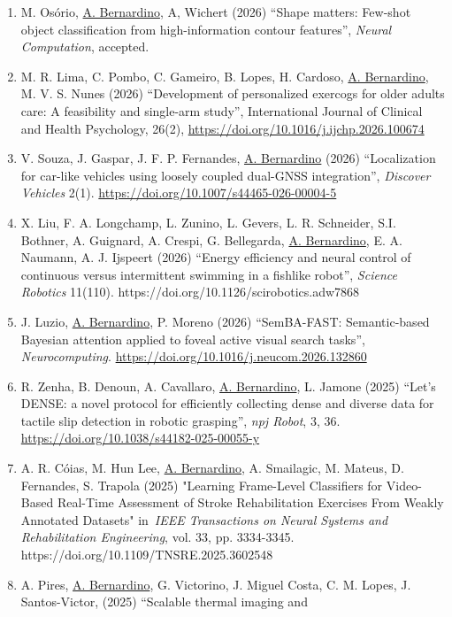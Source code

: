 \begin{enumerate}
\def\labelenumi{\arabic{enumi}.}
\item
  M. Osório, \ul{A. Bernardino}, A, Wichert (2026) ``Shape matters:
  Few-shot object classification from high-information contour
  features'', \emph{Neural Computation}, accepted.
\item
  M. R. Lima, C. Pombo, C. Gameiro, B. Lopes, H. Cardoso, \ul{A.
  Bernardino}, M. V. S. Nunes (2026) ``Development of personalized
  exercogs for older adults care: A feasibility and single-arm study'',
  International Journal of Clinical and Health Psychology, 26(2),
  \url{https://doi.org/10.1016/j.ijchp.2026.100674}
\item
  V. Souza, J. Gaspar, J. F. P. Fernandes, \ul{A. Bernardino} (2026)
  ``Localization for car-like vehicles using loosely coupled dual-GNSS
  integration'', \emph{Discover Vehicles} 2(1).
  \url{https://doi.org/10.1007/s44465-026-00004-5}
\item
  X. Liu, F. A. Longchamp, L. Zunino, L. Gevers, L. R. Schneider, S.I.
  Bothner, A. Guignard, A. Crespi, G. Bellegarda, \ul{A. Bernardino}, E.
  A. Naumann, A. J. Ijspeert (2026) ``Energy efficiency and neural
  control of continuous versus intermittent swimming in a fishlike
  robot'', \emph{Science Robotics} 11(110).
  https://doi.org/10.1126/scirobotics.adw7868
\item
  J. Luzio, \ul{A. Bernardino}, P. Moreno (2026) ``SemBA-FAST:
  Semantic-based Bayesian attention applied to foveal active visual
  search tasks'', \emph{Neurocomputing}.
  \url{https://doi.org/10.1016/j.neucom.2026.132860}
\item
  R. Zenha, B. Denoun, A. Cavallaro, \ul{A. Bernardino}, L. Jamone
  (2025) ``Let's DENSE: a novel protocol for efficiently collecting
  dense and diverse data for tactile slip detection in robotic
  grasping'', \emph{npj Robot}, 3, 36.
  \url{https://doi.org/10.1038/s44182-025-00055-y}
\item
  A. R. Cóias, M. Hun Lee, \ul{A. Bernardino}, A. Smailagic, M. Mateus,
  D. Fernandes, S. Trapola (2025) "Learning Frame-Level Classifiers for
  Video-Based Real-Time Assessment of Stroke Rehabilitation Exercises
  From Weakly Annotated Datasets" in~\emph{IEEE Transactions on Neural
  Systems and Rehabilitation Engineering}, vol. 33, pp. 3334-3345.
  https://doi.org/10.1109/TNSRE.2025.3602548
\item
  A. Pires, \ul{A. Bernardino}, G. Victorino, J. Miguel Costa, C. M.
  Lopes, J. Santos-Victor, (2025) ``Scalable thermal imaging and

\end{enumerate}
